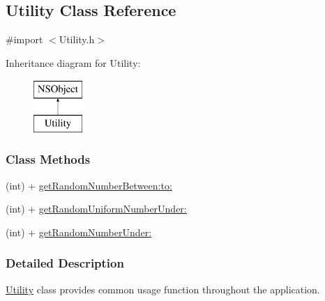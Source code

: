 \hypertarget{interface_utility}{\subsection{Utility Class Reference}
\label{d3/dc7/interface_utility}
}


{\ttfamily \#import $<$Utility.\-h$>$}

Inheritance diagram for Utility\-:\begin{figure}[H]
\begin{center}
\leavevmode
\includegraphics[height=2.000000cm]{d3/dc7/interface_utility}
\end{center}
\end{figure}
\subsubsection*{Class Methods}
\begin{DoxyCompactItemize}
\item 
(int) + \hyperlink{interface_utility_a1fadf871f2de27c45caf4497a769f3d8}{get\-Random\-Number\-Between\-:to\-:}
\item 
(int) + \hyperlink{interface_utility_a18dd8a4d335aacab117cfefa4fffb06c}{get\-Random\-Uniform\-Number\-Under\-:}
\item 
(int) + \hyperlink{interface_utility_a7af585df1742d836af6bc5b0eaf09cd3}{get\-Random\-Number\-Under\-:}
\end{DoxyCompactItemize}


\subsubsection{Detailed Description}
\hyperlink{interface_utility}{Utility} class provides common usage function throughout the application. 

